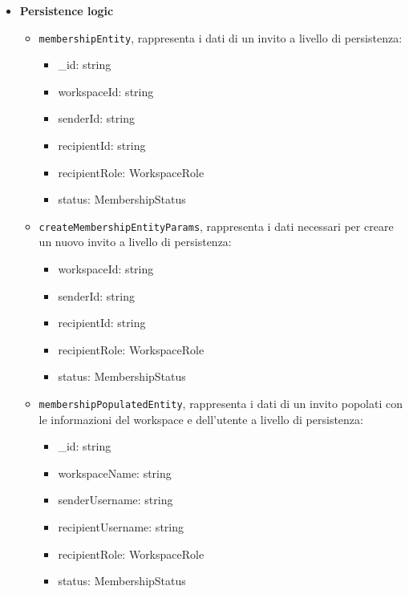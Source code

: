 \documentclass[a4paper, 11pt]{article}
\begin{document}
\begin{itemize}
	\item \textbf{Persistence logic}
    	\begin{itemize}
      		\item \texttt{membershipEntity}, rappresenta i dati di un invito a livello di persistenza:
    			\begin{itemize}
          			\item \_id: string
          			\item workspaceId: string
          			\item senderId: string
          			\item recipientId: string
		  			\item recipientRole: WorkspaceRole
		  			\item status: MembershipStatus
        		\end{itemize}
			\item \texttt{createMembershipEntityParams}, rappresenta i dati necessari per creare un nuovo invito a livello di persistenza:
    			\begin{itemize}
          			\item workspaceId: string
          			\item senderId: string
          			\item recipientId: string
		  			\item recipientRole: WorkspaceRole
		  			\item status: MembershipStatus
        		\end{itemize}
			\item \texttt{membershipPopulatedEntity}, rappresenta i dati di un invito popolati con le informazioni del workspace e dell'utente a livello di persistenza:
    			\begin{itemize}
					\item \_id: string
          			\item workspaceName: string
          			\item senderUsername: string
          			\item recipientUsername: string
          			\item recipientRole: WorkspaceRole
          			\item status: MembershipStatus
        		\end{itemize}
    	\end{itemize}


\end{itemize}
\end{document}
